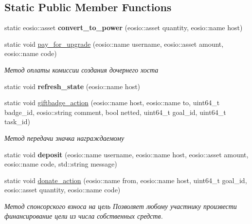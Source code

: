 \subsection*{Static Public Member Functions}
\begin{DoxyCompactItemize}
\item 
\mbox{\label{classeosio_1_1unicore_a636683722a5dfb0a416b26888a78186c}} 
static eosio\+::asset {\bfseries convert\+\_\+to\+\_\+power} (eosio\+::asset quantity, eosio\+::name host)
\item 
static void \mbox{\hyperlink{classeosio_1_1unicore_af4376715edeb68b09c6921cd4d101345}{pay\+\_\+for\+\_\+upgrade}} (eosio\+::name username, eosio\+::asset amount, eosio\+::name code)
\begin{DoxyCompactList}\small\item\em Метод оплаты комиссии создания дочернего хоста \end{DoxyCompactList}\item 
\mbox{\label{classeosio_1_1unicore_af67dcbc765acec01896202ca20159ecf}} 
static void {\bfseries refresh\+\_\+state} (eosio\+::name host)
\item 
static void \mbox{\hyperlink{classeosio_1_1unicore_a5e0d285466d37fa9f315b5a52dba4c8a}{giftbadge\+\_\+action}} (eosio\+::name host, eosio\+::name to, uint64\+\_\+t badge\+\_\+id, eosio\+::string comment, bool netted, uint64\+\_\+t goal\+\_\+id, uint64\+\_\+t task\+\_\+id)
\begin{DoxyCompactList}\small\item\em Метод передачи значка награждаемому \end{DoxyCompactList}\item 
\mbox{\label{classeosio_1_1unicore_a77606350bcf0ef3b500a0cf29b754311}} 
static void {\bfseries deposit} (eosio\+::name username, eosio\+::name host, eosio\+::asset amount, eosio\+::name code, std\+::string message)
\item 
static void \mbox{\hyperlink{classeosio_1_1unicore_a466aba74657c6022cc0d9163bd502625}{donate\+\_\+action}} (eosio\+::name from, eosio\+::name host, uint64\+\_\+t goal\+\_\+id, eosio\+::asset quantity, eosio\+::name code)
\begin{DoxyCompactList}\small\item\em Метод спонсорского взноса на цель Позволяет любому участнику произвести финансирование цели из числа собственных средств. \end{DoxyCompactList}\item 

\end{DoxyCompactItemize}

